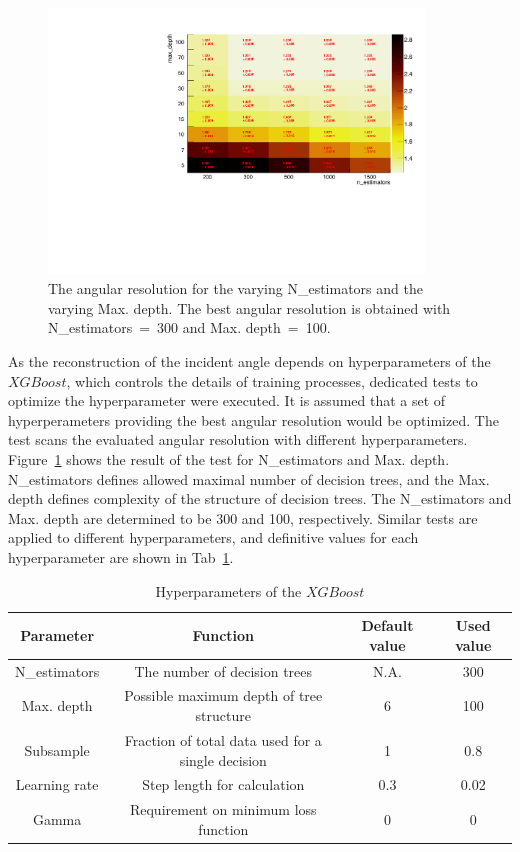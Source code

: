 \documentclass[jkps,preprint,fleqn,showpacs,showkeys]{revtex4}
\newcommand{\XGB}{XGBoost}
\begin{document}
\begin{figure}[!hbt]
\includegraphics[width=0.89\textwidth]{figures/optimization_plot.pdf}
\caption{The angular resolution for the varying N\_estimators and the varying Max. depth. The best angular resolution is obtained with N\_estimators~=~300 and Max. depth~=~100. }
\label{fig:par_scan}
\end{figure}

As the reconstruction of the incident angle depends on hyperparameters of the $\XGB$, which controls the details of training processes, dedicated tests to optimize the hyperparameter were executed. It is assumed that a set of hyperperameters providing the best angular resolution would be optimized. The test scans the evaluated angular resolution with different hyperparameters. Figure~\ref{fig:par_scan} shows the result of the test for N\_estimators and Max. depth. N\_estimators defines allowed maximal number of decision trees, and the Max. depth defines complexity of the structure of decision trees. The N\_estimators and Max. depth are determined to be 300 and 100, respectively. Similar tests are applied to different hyperparameters, and definitive values for each hyperparameter are shown in Tab~\ref{tab:XgbPar}.
 
\begin{table}[hbt!]
\centering
\caption{Hyperparameters of the $\XGB$}
\begin{tabular}{cccc}
\hline 
Parameter & Function & Default value & Used value \\ \hline 
N\_estimators & The number of decision trees & N.A. & 300 \\  
Max. depth & Possible maximum depth of tree structure & 6 & 100 \\ 
Subsample & Fraction of total data used for a single decision & 1 & 0.8 \\ 
Learning rate & Step length for calculation & 0.3 & 0.02 \\ 
Gamma & Requirement on minimum loss function & 0 & 0 \\ 
\hline
\end{tabular}
\label{tab:XgbPar}
\end{table}
\end{document}
